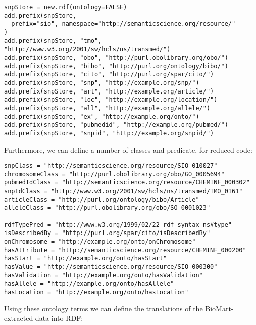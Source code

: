 \documentclass[12pt]{article}
\begin{document}
\begin{footnotesize}
\begin{verbatim}
snpStore = new.rdf(ontology=FALSE)
add.prefix(snpStore,
  prefix="sio", namespace="http://semanticscience.org/resource/"
)
add.prefix(snpStore, "tmo", "http://www.w3.org/2001/sw/hcls/ns/transmed/")
add.prefix(snpStore, "obo", "http://purl.obolibrary.org/obo/")
add.prefix(snpStore, "bibo", "http://purl.org/ontology/bibo/")
add.prefix(snpStore, "cito", "http://purl.org/spar/cito/")
add.prefix(snpStore, "snp", "http://example.org/snp/")
add.prefix(snpStore, "art", "http://example.org/article/")
add.prefix(snpStore, "loc", "http://example.org/location/")
add.prefix(snpStore, "all", "http://example.org/allele/")
add.prefix(snpStore, "ex", "http://example.org/onto/")
add.prefix(snpStore, "pubmedid", "http://example.org/pubmed/")
add.prefix(snpStore, "snpid", "http://example.org/snpid/")
\end{verbatim}
\end{footnotesize}

Furthermore, we can define a number of classes and predicate, for reduced code:

\begin{footnotesize}
\begin{verbatim}
snpClass = "http://semanticscience.org/resource/SIO_010027"
chromosomeClass = "http://purl.obolibrary.org/obo/GO_0005694"
pubmedIdClass = "http://semanticscience.org/resource/CHEMINF_000302"
snpIdClass = "http://www.w3.org/2001/sw/hcls/ns/transmed/TMO_0161"
articleClass = "http://purl.org/ontology/bibo/Article"
alleleClass = "http://purl.obolibrary.org/obo/SO_0001023"

rdfTypePred = "http://www.w3.org/1999/02/22-rdf-syntax-ns#type"
isDescribedBy = "http://purl.org/spar/cito/isDescribedBy"
onChromosome = "http://example.org/onto/onChromosome"
hasAttribute = "http://semanticscience.org/resource/CHEMINF_000200"
hasStart = "http://example.org/onto/hasStart"
hasValue = "http://semanticscience.org/resource/SIO_000300"
hasValidation = "http://example.org/onto/hasValidation"
hasAllele = "http://example.org/onto/hasAllele"
hasLocation = "http://example.org/onto/hasLocation"
\end{verbatim}
\end{footnotesize}


Using these ontology terms we can define the translations of the BioMart-extracted
data into RDF:
\end{document}
